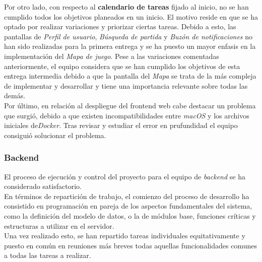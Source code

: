 \documentclass[11pt, a4paper, titlepage]{article}
\begin{document}
Por otro lado, con respecto al \textbf{calendario de tareas} fijado al inicio, no se han cumplido todos los objetivos planeados en un inicio. El motivo reside en que se ha optado por realizar variaciones y priorizar ciertas tareas.
Debido a esto, las pantallas de \textit{Perfil de usuario}, \textit{Búsqueda de partida} y \textit{Buzón de notificaciones} no han sido realizadas para la primera entrega y se ha puesto un mayor enfasis en la implementación del \textit{Mapa de juego}.
Pese a las variaciones comentadas anteriormente, el equipo considera que se han cumplido los objetivos de esta entrega intermedia debido a que la pantalla del \textit{Mapa} se trata de la más compleja de implementar y desarrollar y tiene una importancia relevante sobre todas las demás. \\

Por último, en relación al despliegue del frontend web cabe destacar un problema que surgió, debido a que existen incompatibilidades entre \textit{macOS} y los archivos iniciales de\textit{Docker}. Tras revisar y estudiar el error en prufundidad el equipo consiguió solucionar el problema.

\subsubsection{Backend}

El proceso de ejecución y control del proyecto para el equipo de \textit{backend} se ha considerado satisfactorio.\\


En términos de repartición de trabajo, el comienzo del proceso de desarrollo ha consistido en programación en pareja de los aspectos fundamentales del sistema, como la definición del modelo de datos, o la de módulos base, funciones críticas y estructuras a utilizar en el servidor. \\

Una vez realizado esto, se han repartido tareas individuales equitativamente y puesto en común en reuniones más breves todas aquellas funcionalidades comunes a todas las tareas a realizar. \\

\end{document}
